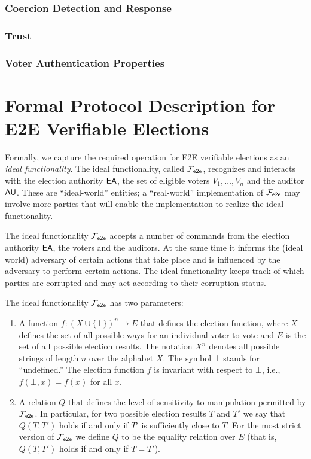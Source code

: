 \subsubsection{Coercion Detection and Response}
\subsubsection{Trust}
\subsubsection{Voter Authentication Properties}



\section{Formal Protocol Description for E2E Verifiable Elections}

Formally, we capture the required operation for E2E verifiable
elections as an \emph{ideal functionality}. The ideal functionality,
called $\mathcal{F}_{\mathsf{e2e}}$, recognizes and interacts with the election authority
$\mathsf{EA}$, the set of eligible voters $V_1,\ldots, V_n$ and the auditor
$\mathsf{AU}$.  These are ``ideal-world'' entities; a ``real-world''
implementation of $\mathcal{F}_{\mathsf{e2e}}$ may involve more parties that will enable
the implementation to realize the ideal functionality.

The ideal functionality $\mathcal{F}_{\mathsf{e2e}}$ accepts a number of commands from the
election authority $\mathsf{EA}$, the voters and the auditors. At the same
time it informs the (ideal world) adversary of certain actions that
take place and is influenced by the adversary to perform certain
actions. The ideal functionality keeps track of which parties are
corrupted and may act according to their corruption status. 

The ideal functionality $\mathcal{F}_{\mathsf{e2e}}$ has two parameters:

\begin{enumerate}
\item A function $f: (X\cup \{\bot\})^n\rightarrow E$ that defines the
  election function, where $X$ defines the set of all possible ways
  for an individual voter to vote and $E$ is the set of all possible
  election results. The notation $X^n$ denotes all possible strings of
  length $n$ over the alphabet $X$. The symbol $\bot$ stands for
  ``undefined.''  The election function $f$ is invariant with respect
  to $\bot$, i.e., $f(\bot, x) = f(x)$ for all $x$.  
\item A relation $Q$ that defines the level of sensitivity to
  manipulation permitted by $\mathcal{F}_{\mathsf{e2e}}$. In particular, for two possible
  election results $T$ and $T'$ we say that $Q(T,T')$ holds if and
  only if $T'$ is sufficiently close to $T$. For the most strict
  version of $\mathcal{F}_{\mathsf{e2e}}$ we define $Q$ to be the equality relation over
  $E$ (that is, $Q(T,T')$ holds if and only if $T=T'$). 
\end{enumerate}

